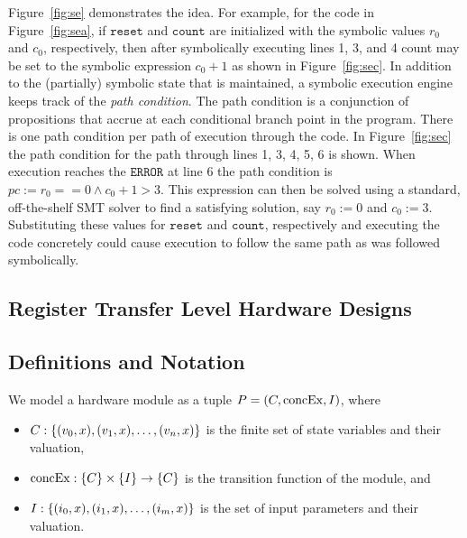 Figure~\ref{fig:se} demonstrates the idea. 
For example, for the code in
Figure~\ref{fig:sea}, if $\mathtt{reset}$ and $\mathtt{count}$ are initialized
with the symbolic values $r_0$ and $c_0$, respectively, then after symbolically
executing lines 1, 3, and 4 count may be set to the symbolic expression $c_0 +
1$ as shown in Figure~\ref{fig:sec}. In addition to the (partially) symbolic
state that is maintained, a symbolic execution engine keeps track of the
\emph{path condition}. The path condition is a conjunction of propositions that
accrue at each conditional branch point in the program. There is one path
condition per path of execution through the code. In Figure~\ref{fig:sec} the
path condition for the path through lines 1, 3, 4, 5, 6 is shown. When execution
reaches the $\mathtt{ERROR}$ at line 6 the path condition is $\mathit{pc} := r_0
== 0 \wedge c_0 + 1 > 3$. This expression can then be solved using a standard,
off-the-shelf SMT solver to find a satisfying solution, say $r_0 := 0$ and $c_0
:= 3$. Substituting these values for $\mathtt{reset}$ and $\mathtt{count}$,
respectively and executing the code concretely could cause execution to follow
the same path as was followed symbolically.

\subsection{Register Transfer Level Hardware Designs}

\subsection{Definitions and Notation}

We model a hardware module as a tuple $P = (C,
\mathrm{concEx}, I)$, where
\begin{itemize}
\item $C: \{(v_0,x), (v_1,x), \ldots, (v_n,x)\}$ is the finite set of state variables and their valuation,
\item $\mathrm{concEx}: \{C\} \times \{I\} \rightarrow 
  \{C\}$ is the transition function of the module, and
\item $I: \{(i_0,x), (i_1,x),
  \ldots, (i_m,x)\}$ is the set of input parameters and their valuation.
\end{itemize}

